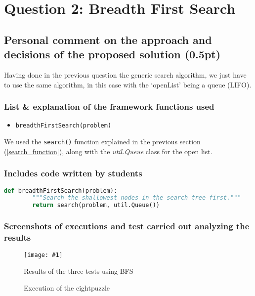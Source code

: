 \documentclass{article}
\newcommand{\myFigure}[4]{%
    \begin{figure}[H]
        \texttt{[image: \#1]}
        \centering
        \caption{#2}
        \label{#3}
    \end{figure}
}
\begin{document}
\pagebreak

\section{Question 2: Breadth First Search}


\subsection{Personal comment on the approach and decisions of the proposed solution (0.5pt)}

Having done in the previous question the generic search algorithm, we just have to use the same algorithm, in this case with the `openList' being a queue (LIFO).

\subsubsection{List \& explanation of the framework functions used}

\begin{itemize}
    \item \texttt{breadthFirstSearch(problem)}
\end{itemize}

We used the \texttt{search()} function explained in the previous section (\ref{search_function}), along with the \emph{util.Queue} class for the open list.

\subsubsection{Includes code written by students}

\begin{lstlisting}[language=python,captionpos=t,caption={The \emph{BFS} function (\emph{search.py})}]
    def breadthFirstSearch(problem):
        """Search the shallowest nodes in the search tree first."""
        return search(problem, util.Queue())
\end{lstlisting}

\subsubsection{Screenshots of executions and test carried out analyzing the results}

\myFigure{./img/ex2/victoryBFS}{Results of the three tests using BFS}{victoryBFS}{.8}

\begin{figure}[H]
    \centering
    \caption{Execution of the eightpuzzle}
    \centering
    \label{8p}
\end{figure}
\end{document}
